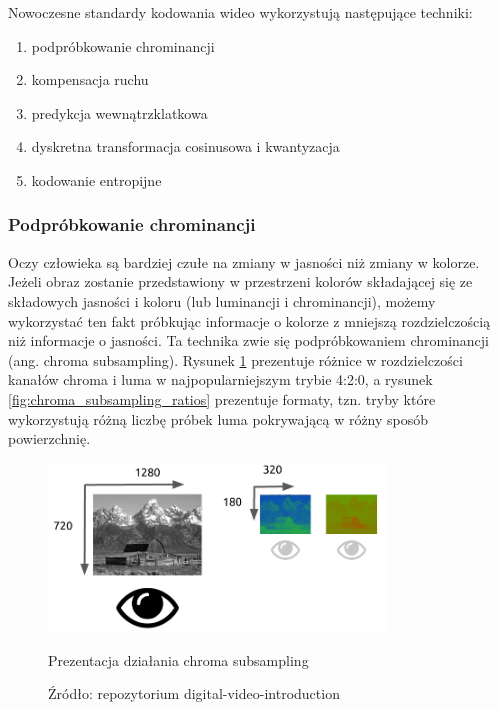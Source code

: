 Nowoczesne standardy kodowania wideo wykorzystują następujące techniki:

\begin{enumerate}
    \item podpróbkowanie chrominancji
    \item kompensacja ruchu
    \item predykcja wewnątrzklatkowa
    \item dyskretna transformacja cosinusowa i kwantyzacja
    \item kodowanie entropijne
\end{enumerate}

\subsubsection{Podpróbkowanie chrominancji}

Oczy człowieka są bardziej czułe na zmiany w jasności niż zmiany w kolorze. Jeżeli obraz
zostanie przedstawiony w przestrzeni kolorów składającej się ze składowych jasności i koloru (lub
luminancji i chrominancji), możemy wykorzystać ten fakt próbkując informacje o kolorze z mniejszą
rozdzielczością niż informacje o jasności. Ta technika zwie się podpróbkowaniem chrominancji (ang.
chroma subsampling). Rysunek \ref{fig:chroma_subsampling_resolution} prezentuje różnice w
rozdzielczości kanałów chroma i luma w najpopularniejszym trybie 4:2:0, a rysunek
\ref{fig:chroma_subsampling_ratios} prezentuje formaty, tzn. tryby które wykorzystują różną liczbę
próbek luma pokrywającą w różny sposób powierzchnię.

\begin{figure}[H]
    \centering
    \includegraphics[width=0.8\textwidth]{img/rozdzial2/ycbcr_subsampling_resolution}
    \caption{Prezentacja działania chroma subsampling}
    \caption*{Źródło: repozytorium digital-video-introduction \cite{digital_video_introduction}}
    \label{fig:chroma_subsampling_resolution}
\end{figure}

